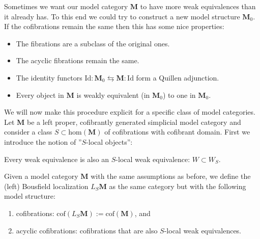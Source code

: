     Sometimes we want our model category $\mathbf{M}$ to have more weak equivalences than it already has. To this end we could try to construct a new model structure $\mathbf{M}_0$. If the cofibrations remain the same then this has some nice properties:
    \begin{itemize}
        \item The fibrations are a subclass of the original ones.
        \item The acyclic fibrations remain the same.
        \item The identity functors $\text{Id}:\mathbf{M}_0\leftrightarrows\mathbf{M}:\text{Id}$ form a Quillen adjunction.
        \item Every object in $\mathbf{M}$ is weakly equivalent (in $\mathbf{M}_0$) to one in $\mathbf{M}_0$.
    \end{itemize}
    We will now make this procedure explicit for a specific class of model categories. Let $\mathbf{M}$ be a left proper, cofibrantly generated simplicial model category and consider a class $S\subset\text{hom}(\mathbf{M})$ of cofibrations with cofibrant domain. First we introduce the notion of ''$S$-local objects'':
    \begin{property}
        Every weak equivalence is also an $S$-local weak equivalence: $W\subset W_S$.
    \end{property}
    \begin{construct}
        Given a model category $\mathbf{M}$ with the same assumptions as before, we define the (left) Bousfield localization $L_S\mathbf{M}$ as the same category but with the following model structure:
        \begin{enumerate}
            \item cofibrations: $\text{cof}(L_S\mathbf{M}):=\text{cof}(\mathbf{M})$, and
            \item acyclic cofibrations: cofibrations that are also $S$-local weak equivalences.
        \end{enumerate}
    \end{construct}

